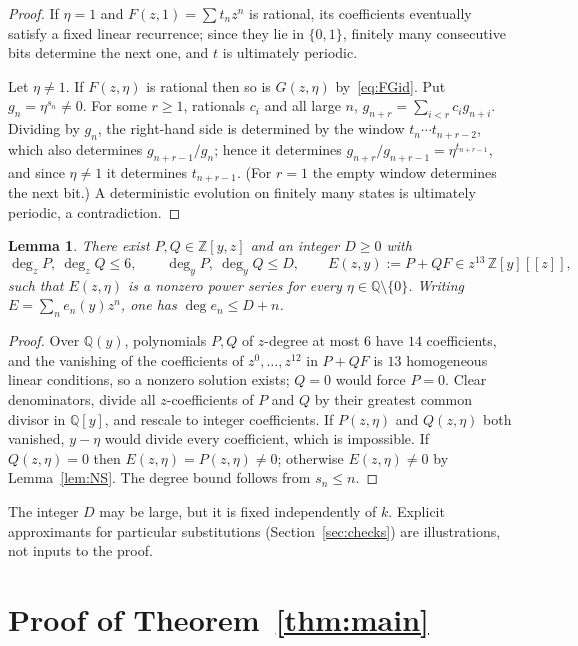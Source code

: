 \documentclass[11pt]{amsart}
\newtheorem{lemma}[theorem]{Lemma}
\theoremstyle{remark}
\theoremstyle{definition}
\numberwithin{equation}{section}
\newcommand{\Q}{\mathbb{Q}}
\newcommand{\Z}{\mathbb{Z}}
\begin{document}
\begin{proof}
If $\eta=1$ and $F(z,1)=\sum t_nz^n$ is rational, its coefficients eventually satisfy a fixed linear recurrence; since they lie in $\{0,1\}$, finitely many consecutive bits determine the next one, and $t$ is ultimately periodic.

Let $\eta\ne1$. If $F(z,\eta)$ is rational then so is $G(z,\eta)$ by~\eqref{eq:FGid}. Put $g_n=\eta^{s_n}\ne0$. For some $r\ge1$, rationals $c_i$ and all large $n$, $g_{n+r}=\sum_{i<r}c_ig_{n+i}$. Dividing by $g_n$, the right-hand side is determined by the window $t_n\cdots t_{n+r-2}$, which also determines $g_{n+r-1}/g_n$; hence it determines $g_{n+r}/g_{n+r-1}=\eta^{t_{n+r-1}}$, and since $\eta\ne1$ it determines $t_{n+r-1}$. (For $r=1$ the empty window determines the next bit.) A deterministic evolution on finitely many states is ultimately periodic, a contradiction.
\end{proof}

\begin{lemma}\label{lem:Pade}
There exist $P,Q\in\Z[y,z]$ and an integer $D\ge0$ with
\[
\deg_zP,\ \deg_zQ\le6,\qquad \deg_yP,\ \deg_yQ\le D,\qquad
E(z,y):=P+QF\in z^{13}\,\Z[y][[z]],
\]
such that $E(z,\eta)$ is a nonzero power series for every $\eta\in\Q\setminus\{0\}$. Writing $E=\sum_ne_n(y)z^n$, one has $\deg e_n\le D+n$.
\end{lemma}

\begin{proof}
Over $\Q(y)$, polynomials $P,Q$ of $z$-degree at most $6$ have $14$ coefficients, and the vanishing of the coefficients of $z^0,\dots,z^{12}$ in $P+QF$ is $13$ homogeneous linear conditions, so a nonzero solution exists; $Q=0$ would force $P=0$. Clear denominators, divide all $z$-coefficients of $P$ and $Q$ by their greatest common divisor in $\Q[y]$, and rescale to integer coefficients. If $P(z,\eta)$ and $Q(z,\eta)$ both vanished, $y-\eta$ would divide every coefficient, which is impossible. If $Q(z,\eta)=0$ then $E(z,\eta)=P(z,\eta)\ne0$; otherwise $E(z,\eta)\ne0$ by Lemma~\ref{lem:NS}. The degree bound follows from $s_n\le n$.
\end{proof}

The integer $D$ may be large, but it is fixed independently of $k$. Explicit approximants for particular substitutions (Section~\ref{sec:checks}) are illustrations, not inputs to the proof.

\section{Proof of Theorem~\ref{thm:main}}\label{sec:proof}
\end{document}
